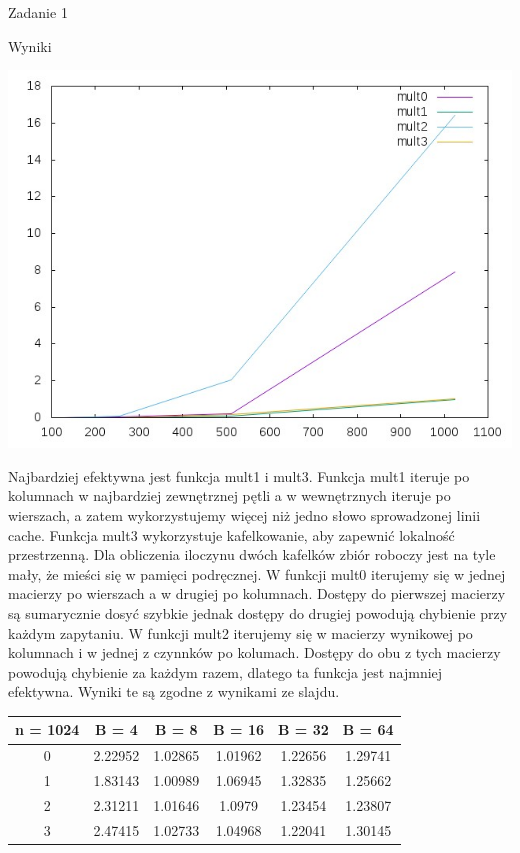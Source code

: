 \documentclass[11pt,wide]{mwart}
\begin{document}
\begin{section}{Zadanie 1}
\begin{subsection}{Wyniki}
 \begin{center}
 \includegraphics[scale=0.75]{wykres.jpg}
 \end{center}
 Najbardziej efektywna jest funkcja mult1 i mult3. Funkcja mult1 iteruje po kolumnach w najbardziej zewnętrznej pętli a w wewnętrznych iteruje po wierszach, a zatem wykorzystujemy więcej niż jedno słowo sprowadzonej linii cache. Funkcja mult3 wykorzystuje kafelkowanie, aby zapewnić lokalność przestrzenną. Dla obliczenia iloczynu dwóch kafelków zbiór roboczy jest na tyle mały, że mieści się w pamięci podręcznej. W funkcji mult0 iterujemy się w jednej macierzy po wierszach a w drugiej po kolumnach. Dostępy do pierwszej macierzy są sumarycznie dosyć szybkie jednak dostępy do drugiej powodują chybienie przy każdym zapytaniu. W funkcji mult2 iterujemy się w macierzy wynikowej po kolumnach i w jednej z czynnków po kolumach. Dostępy do obu z tych macierzy powodują chybienie za każdym razem, dlatego ta funkcja jest najmniej efektywna. Wyniki te są zgodne z wynikami ze slajdu. 
 \begin{center}
\begin{tabular}{|c|c|c|c|c|c|}
\hline
n = 1024 & B = 4 & B = 8 & B = 16 & B = 32 & B = 64\\
\hline
0 & 2.22952 & 1.02865 & 1.01962 & 1.22656 & 1.29741\\
\hline
1 & 1.83143 & 1.00989 & 1.06945 & 1.32835 & 1.25662\\
\hline
2 & 2.31211 & 1.01646 & 1.0979 & 1.23454 & 1.23807\\
\hline
3 & 2.47415 & 1.02733 & 1.04968 & 1.22041 & 1.30145\\
\hline

\end{tabular}
\end{center}
\end{subsection}
\end{section}
\end{document}
